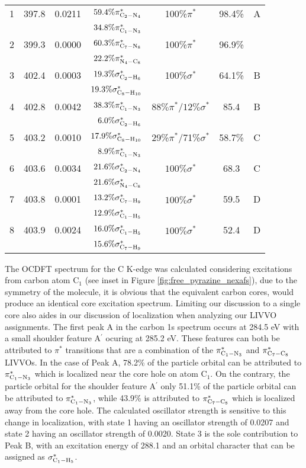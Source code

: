 \documentclass{article}
\begin{document}
\begin{table}[t!]
\begin{tabular}{cccrccc}
1 & 397.8 & 0.0211 &  $59.4\%\pi^*_{\rm C_2-N_4}$ & 100\%$\pi^*$ & 98.4\% & A \\
& & & $34.8\%\pi^*_{\rm C_1-N_3}$ & & \\
2 & 399.3 & 0.0000 & $60.3\%\pi^*_{\rm C_7-N_8}$ & 100\%$\pi^*$ & 96.9\% & \\
& & & $22.2\%\pi^*_{\rm N_4-C_8}$ & & \\
3 & 402.4 & 0.0003 & $19.3\%\sigma^*_{\rm C_2-H_6}$ & 100\%$\sigma^*$ & 64.1\% & B \\
& & & $19.3\%\sigma^*_{\rm C_8-H_{10}}$ & & \\
4 & 402.8 & 0.0042 & $38.3\%\pi^*_{\rm C_1-N_3}$ & $88\%\pi^*$/$12\%\sigma^*$ & 85.4 & B \\
& & & $6.0\%\sigma^*_{\rm C_2-H_{6}}$ & & \\
5 & 403.2 & 0.0010 & $17.9\%\sigma^*_{\rm C_8-H_{10}}$ & 29\%$\pi^*$/71\%$\sigma^*$ & 58.7\% & C\\
& & & $8.9\%\pi^*_{\rm C_1-N_3}$ & & \\
6 & 403.6 & 0.0034 & $21.6\%\sigma^*_{\rm C_2-N_4}$ & $100\%\sigma^*$ & 68.3 & C \\
& & & $21.6\%\sigma^*_{\rm N_4-C_8}$ & & \\
7 & 403.8 & 0.0001 & $13.2\%\sigma^*_{\rm C_7-H_9}$ & $100\%\sigma^*$ & 59.5 & D \\
& & & $12.9\%\sigma^*_{\rm C_1-H_5}$ & & \\
8 & 403.9 & 0.0024 & $16.0\%\sigma^*_{\rm C_1-H_{5}}$ & $100\%\sigma^*$ & 52.4 & D \\
& & & $15.6\%\sigma^*_{\rm C_7-H_9}$ & & \\
\hline
\end{tabular}
\label{tab:free_pyrazine_energy}
\end{table}

The OCDFT spectrum for the C K-edge was calculated considering excitations from carbon atom C$_1$ (see inset in Figure \ref{fig:free_pyrazine_nexafs}), due to the symmetry of the molecule, it is obvious that the equivalent carbon cores, would produce an identical core excitation spectrum. Limiting our discussion to a single core also aides in our discussion of localization when analyzing our LIVVO assignments. The first peak A in the carbon 1s spectrum occurs at 284.5 eV with a small shoulder feature A$^{\prime}$ ocuring at 285.2 eV. These features can both be attributed to $\pi^*$ transitions that are a combination of the $\pi^*_{\rm C_1-N_3}$ and $\pi^*_{\rm C_7-C_8}$ LIVVOs. In the case of Peak A, 78.2\% of the particle orbital can be attributed to $\pi^*_{\rm C_1-N_3}$ which is localized near the core hole on atom C$_1$. On the contrary, the particle orbital for the shoulder feature A$^{\prime}$ only 51.1\% of the particle orbital can be attributed to $\pi^*_{\rm C_1-N_3}$, while 43.9\% is attributed to $\pi^*_{\rm C_7-C_8}$ which is localized away from the core hole. The calculated oscillator strength is sensitive to this change in localization, with state 1 having an oscillator strength of 0.0207 and state 2 having an oscillator strength of 0.0020. State 3 is the sole contribution to Peak B, with an excitation energy of 288.1 and an orbital character that can be assigned as  $\sigma^*_{\rm C_1-H_5}$.
\end{document}
